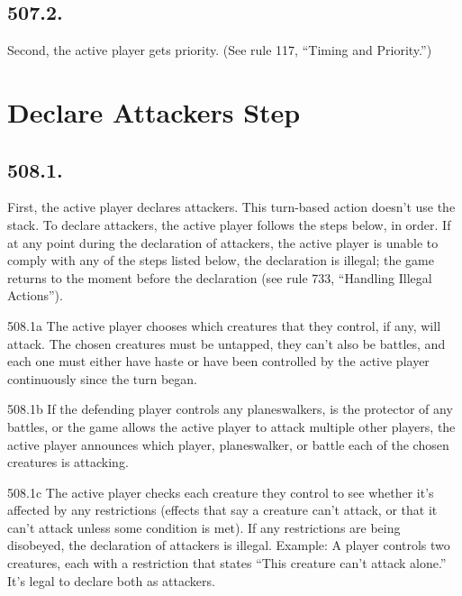 \subsection*{507.2.}
Second, the active player gets priority. (See rule 117, “Timing and Priority.”)

\section{Declare Attackers Step}
\subsection*{508.1.}
First, the active player declares attackers. This turn-based action doesn’t use the stack. To declare attackers, the active player follows the steps below, in order. If at any point during the declaration of attackers, the active player is unable to comply with any of the steps listed below, the declaration is illegal; the game returns to the moment before the declaration (see rule 733, “Handling Illegal Actions”).

508.1a The active player chooses which creatures that they control, if any, will attack. The chosen creatures must be untapped, they can’t also be battles, and each one must either have haste or have been controlled by the active player continuously since the turn began.

508.1b If the defending player controls any planeswalkers, is the protector of any battles, or the game allows the active player to attack multiple other players, the active player announces which player, planeswalker, or battle each of the chosen creatures is attacking.

508.1c The active player checks each creature they control to see whether it’s affected by any restrictions (effects that say a creature can’t attack, or that it can’t attack unless some condition is met). If any restrictions are being disobeyed, the declaration of attackers is illegal.
Example: A player controls two creatures, each with a restriction that states “This creature can’t attack alone.” It’s legal to declare both as attackers.

